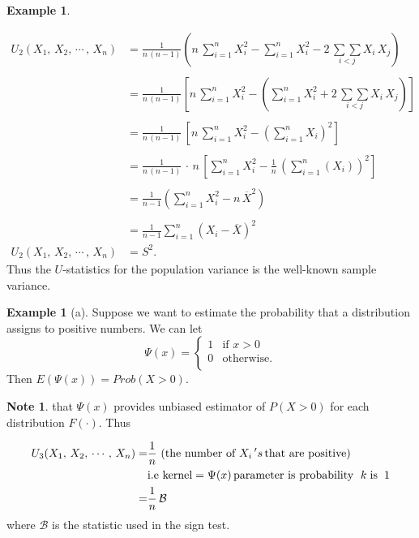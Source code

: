 \documentclass[12pt,a4paper]{report}
\theoremstyle{definition}
\newtheorem{exa}[thm]{Example}
\newtheorem{note}[thm]{Note}
\theoremstyle{plain}
\begin{document}
\begin{exa}
\begin{enumerate}
\begin{align*}
U_2(X_1,\, X_2,\, \cdots\, , \, X_n)
& = \frac{1}{n\, (n-1)}\left(n\, \sum^n_{i = 1} X_i^2 - \sum^n_{i = 1}X_i^2 - 2\, \underset{i<j}{\sum\sum}X_i\, X_j\right)\\\\
& = \frac{1}{n\, (n - 1)}\left[n\, \sum^n_{i = 1} X_i^2 - \left(\sum^n_{i = 1} X^2_i + 2\, \underset{i<j}{\sum\sum}X_i\, X_j\right)\right]\\\\
& = \frac{1}{n\, (n - 1)}\, \left[n\, \sum^n_{i = 1}X_i^2 - \left(\sum^n_{i = 1} X_i\right)^2\right]\\\\
& = \frac{1}{n\, (n - 1)}\, \cdot\, n\, \left[\sum^n_{i = 1} X_i^2 - \frac{1}{n}\,\left(\sum^n_{i = 1}(X_i)\right)^2\right]\\\\
& = \frac{1}{n - 1}\left(\sum^n_{i = 1} X_i^2 - n\, \overline{X}^2\right)\\\\
& = \frac{1}{n - 1}\sum^n_{i = 1} \left(X_i - \overline{X}\right)^2\\
U_2(X_1,\, X_2,\, \cdots\, , \, X_n)& = S^2.
\end{align*}
Thus the $U$-statistics for the population variance is the  well-known sample variance.
\end{enumerate}
\end{exa}



\begin{exa}[a]
Suppose we want to estimate the probability that a distribution assigns to positive numbers. We can let 
$$\Psi(x) = \begin{cases}
1 & \text{if}\, \, x> 0\\
0 & \text{otherwise}.\\
\end{cases}$$
Then $E\left(\Psi(x)\right) = Prob(X > 0)$.
\end{exa}


\begin{note}
that $\Psi(x)$ provides unbiased estimator of $P(X>0)$ for each distribution $F(\cdot)$. Thus
\end{note}
\begin{align*}
U_3(X_1,\, X_2,\, \cdots\, , \, X_n)  = & \frac{1}{n}\,\left(\text{the number of } X_i\, 's\, \text{that are positive}\right)\\
& \text{i.e kernel} = \Psi(x)\, \text{parameter is probability }\hspace{0.1cm} k\hspace{0.1cm}\text{is}\hspace{0.2cm}1\\
= & \frac{1}{n}\, \mathcal{B}
\end{align*}
where $\mathcal{B}$ is the statistic used in the sign test.
\end{document}
